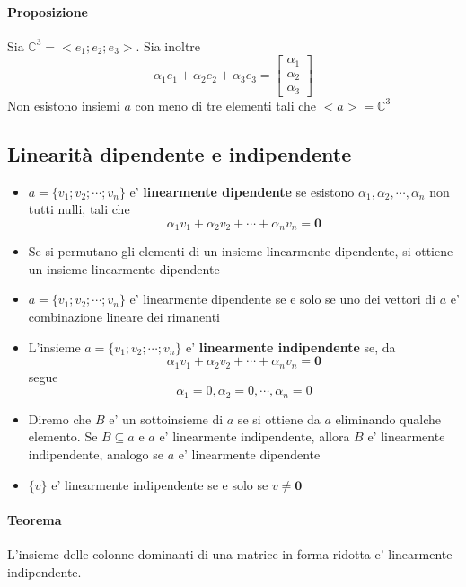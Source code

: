 \documentclass[a4paper, 10pt]{article}
\begin{document}
	\paragraph*{Proposizione} Sia $\mathbb{C}^{3} = <e_1; e_2; e_3>$. Sia inoltre 
	\[ \alpha _1 e_1 + \alpha _2 e_2 + \alpha _3 e_3 = \begin{bmatrix} \alpha _1 \\ \alpha _2 \\ \alpha _3 \end{bmatrix} \]
	Non esistono insiemi $a$ con meno di tre elementi tali che $<a> = \mathbb{C}^3$
	\subsection{Linearità dipendente e indipendente}
	\begin{itemize}
	\item $a = \lbrace v_1; v_2; \cdots; v_n \rbrace$ e' \textbf{linearmente dipendente} se esistono 
						 $\alpha _1, \alpha _2, \cdots, \alpha _n$ non tutti nulli, tali che 
	\[ \alpha_1 v_1 + \alpha_2 v_2 + \cdots + \alpha_n v_n = \textbf{0} \]
	\item Se si permutano gli elementi di un insieme linearmente dipendente, si ottiene un insieme 
					    linearmente dipendente
	\item $a = \lbrace v_1; v_2; \cdots; v_n \rbrace$ e' linearmente dipendente se e solo se uno dei vettori 
						 di $a$ e' combinazione lineare dei rimanenti
	\item L'insieme $a = \lbrace v_1; v_2; \cdots; v_n \rbrace$ e' \textbf{linearmente indipendente} se, da 
							 \[ \alpha_1 v_1 + \alpha_2 v_2 + \cdots + \alpha_n v_n = \textbf{0} \] segue
							 \[ \alpha_1 = 0, \alpha_2 = 0,  \cdots , \alpha_n = 0 \]
	\item Diremo che $B$ e' un sottoinsieme di $a$ se si ottiene da $a$ eliminando qualche elemento. 
		  Se $B \subseteq a$ e $a$ e' linearmente indipendente, allora $B$ e' linearmente indipendente, 
		  analogo se $a$ e' linearmente dipendente
	\item $\lbrace v \rbrace $ e' linearmente indipendente se e solo se $v \neq \textbf{0}$
	\end{itemize}
	\paragraph*{Teorema} L'insieme delle colonne dominanti di una matrice in forma ridotta e' linearmente indipendente. \\
\end{document}
